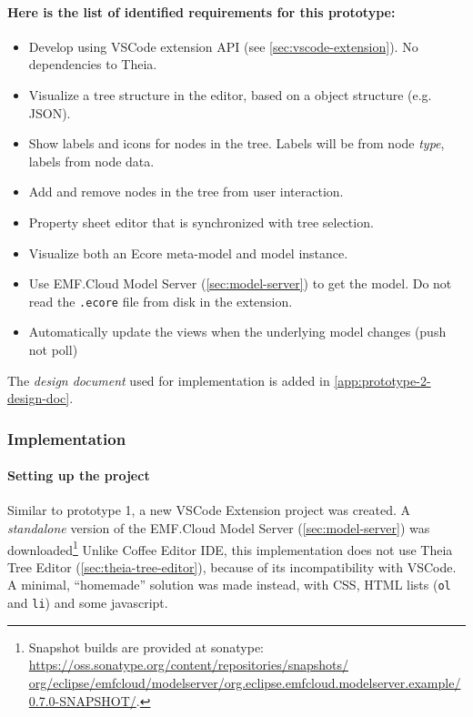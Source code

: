\paragraph*{Here is the list of identified requirements for this prototype:}

\begin{itemize}
  \item Develop using VSCode extension \acrshort{API} (see \cref{sec:vscode-extension}). No dependencies to Theia.
  \item Visualize a tree structure in the editor, based on a object structure (e.g. \gls{JSON}).
  \item Show labels and icons for nodes in the tree. Labels will be from node \emph{type}, labels from node data.
  \item Add and remove nodes in the tree from user interaction.
  \item Property sheet editor that is synchronized with tree selection.
  \item Visualize both an Ecore meta-model and model instance.
  \item Use EMF.Cloud Model Server (\cref{sec:model-server}) to get the model. Do not read the \texttt{.ecore} file from disk in the extension.
  \item Automatically update the views when the underlying model changes (push not poll)
\end{itemize}

The \textit{design document} used for implementation is added in \cref{app:prototype-2-design-doc}.

\subsubsection{Implementation}

\paragraph*{Setting up the project}
Similar to prototype 1, a new \gls{VSCode} Extension project was created.
A \emph{standalone} version of the EMF.Cloud Model Server (\cref{sec:model-server}) was downloaded\footnote{Snapshot builds are provided at sonatype: \href{https://oss.sonatype.org/content/repositories/snapshots/org/eclipse/emfcloud/modelserver/org.eclipse.emfcloud.modelserver.example/0.7.0-SNAPSHOT/}{https://oss.sonatype.org/content/repositories/snapshots/ org/eclipse/emfcloud/modelserver/org.eclipse.emfcloud.modelserver.example/0.7.0-SNAPSHOT/}.}
Unlike Coffee Editor IDE, this implementation does not use Theia Tree Editor (\cref{sec:theia-tree-editor}), because of its incompatibility with \gls{VSCode}.
A minimal, ``homemade'' solution was made instead, with CSS, HTML lists (\texttt{ol} and \texttt{li}) and some javascript.

